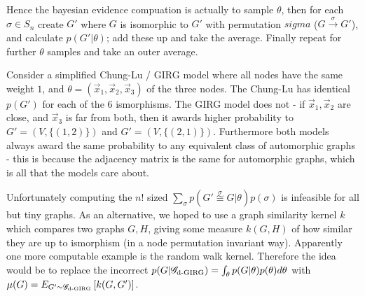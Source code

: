 Hence the bayesian evidence compuation is actually to sample $\theta$,  then for each $\sigma \in S_n$ create $G'$ where $G$ is isomorphic to $G'$ with permutation $sigma$ ($G \stackrel{\sigma}{\to} G'$), and calculate $p(G' | \theta)$; add these up and take the average.
Finally repeat for further $\theta$ samples and take an outer average.


Consider a simplified Chung-Lu / GIRG model where all nodes have the same weight $1$, and $\theta = (\vec{x}_1, \vec{x}_2, \vec{x}_3)$ of the three nodes. The Chung-Lu has identical $p(G')$ for each of the 6 ismorphisms. The GIRG  model does not - if $\vec{x}_1, \vec{x}_2$ are close, and $\vec{x}_3$ is far from both, then it awards higher probability to $G' = (V, \{(1,2)\})$ and $G' = (V, \{(2, 1)\})$. Furthermore both models always award the same probability to any equivalent class of automorphic graphs - this is because the adjacency matrix is the same for automorphic graphs, which is all that the models care about.

Unfortunately computing the $n!$ sized $\sum_{\sigma} p(G' \stackrel{\sigma}{\cong} G | \theta) p(\sigma)$ is infeasible for all but tiny graphs. As an alternative, we hoped to use a graph similarity kernel $k$ which compares two graphs $G, H$, giving some measure $k(G, H)$ of how similar they are up to ismorphism (in a node permutation invariant way).
Apparently one more computable example is the random walk kernel.
Therefore the idea would be to replace the incorrect $p(G | \mathscr{G}_{\text{d-}\mathrm{GIRG}}) = \int_\theta p(G | \theta) p(\theta) d\theta$ with 
$\mu(G) = E_{G' \sim \mathscr{G}_{\text{d-}\mathrm{GIRG}}} \left [ k(G, G') \right ]$.





